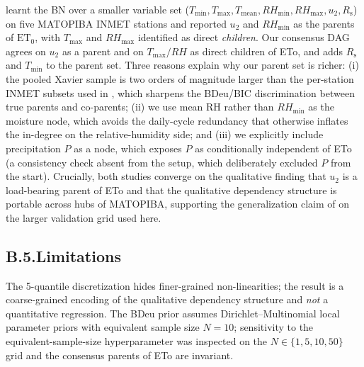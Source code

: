 \citet{Ribeiro2022} learnt the BN over a smaller variable set
($T_\mathrm{min}, T_\mathrm{max}, T_\mathrm{mean}, RH_\mathrm{min},
RH_\mathrm{max}, u_2, R_\mathrm{s}$) on five MATOPIBA INMET
stations and reported $u_2$ and $RH_\mathrm{min}$ as the parents
of $\mathrm{ET}_0$, with $T_\mathrm{max}$ and $RH_\mathrm{max}$
identified as direct \emph{children}. Our consensus DAG agrees
on $u_2$ as a parent and on $T_\mathrm{max}/RH$ as direct children
of ETo, and adds $R_\mathrm{s}$ and $T_\mathrm{min}$ to the parent
set. Three reasons explain why our parent set is richer:
(i) the pooled Xavier sample is two orders of magnitude larger than
the per-station INMET subsets used in \citep{Ribeiro2022}, which
sharpens the BDeu/BIC discrimination between true parents and
co-parents; (ii) we use mean RH rather than $RH_\mathrm{min}$ as
the moisture node, which avoids the daily-cycle redundancy that
otherwise inflates the in-degree on the relative-humidity side; and
(iii) we explicitly include precipitation $P$ as a node, which
exposes $P$ as conditionally independent of ETo (a consistency
check absent from the \citep{Ribeiro2022} setup, which deliberately
excluded $P$ from the start). Crucially, both studies converge on
the qualitative finding that $u_2$ is a load-bearing parent of ETo
and that the qualitative dependency structure is portable across
hubs of MATOPIBA, supporting the generalization claim of
\citep{Ribeiro2022} on the larger validation grid used here.

\subsection*{B.5.\quad Limitations}

The 5-quantile discretization hides finer-grained
non-linearities; the result is a coarse-grained encoding of the
qualitative dependency structure and \emph{not} a quantitative
regression. The BDeu prior assumes Dirichlet--Multinomial local
parameter priors with equivalent sample size $N=10$; sensitivity to
the equivalent-sample-size hyperparameter was inspected on the
$N \in \{1, 5, 10, 50\}$ grid and the consensus parents of ETo are
invariant.
